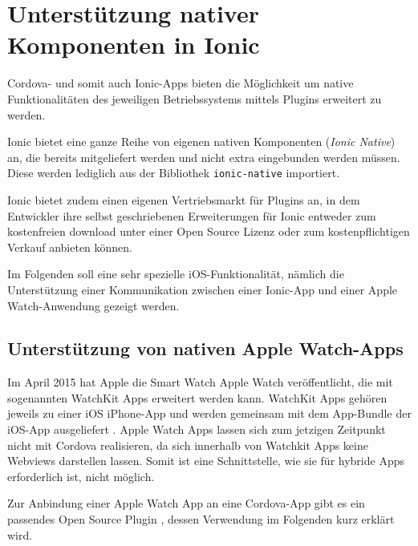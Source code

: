 \chapter{Unterstützung nativer Komponenten in Ionic}
%
Cordova- und somit auch Ionic-Apps bieten die Möglichkeit um native Funktionalitäten des jeweiligen Betriebssystems mittels Plugins erweitert zu werden.

Ionic bietet eine ganze Reihe von eigenen nativen Komponenten (\emph{Ionic Native}) an, die bereits mitgeliefert werden und nicht extra eingebunden werden müssen. Diese werden lediglich aus der Bibliothek \texttt{ionic-native} importiert.

Ionic bietet zudem einen eigenen Vertriebsmarkt für Plugins an, in dem Entwickler ihre selbst geschriebenen Erweiterungen für Ionic entweder zum kostenfreien download unter einer Open Source Lizenz oder zum kostenpflichtigen Verkauf anbieten können. 

Im Folgenden soll eine sehr spezielle iOS-Funktionalität, nämlich die Unterstützung einer Kommunikation zwischen einer Ionic-App und einer Apple Watch-Anwendung gezeigt werden.
%
\section{Unterstützung von nativen Apple Watch-Apps}
%
Im April 2015 hat Apple die Smart Watch Apple Watch veröffentlicht, die mit sogenannten WatchKit Apps erweitert werden kann. WatchKit Apps gehören jeweils zu einer iOS iPhone-App und werden gemeinsam mit dem App-Bundle der iOS-App ausgeliefert \cite{appleAppleWatchProgrammingGuide}. Apple Watch Apps lassen sich zum jetzigen Zeitpunkt nicht mit Cordova realisieren, da sich innerhalb von Watchkit Apps keine Webviews darstellen lassen. Somit ist eine Schnittstelle, wie sie für hybride Apps erforderlich ist, nicht möglich.

Zur Anbindung einer Apple Watch App an eine Cordova-App gibt es ein passendes Open Source Plugin \cite{CrossleyCordovaAppleWatchPlugin}, dessen Verwendung im Folgenden kurz erklärt wird.

